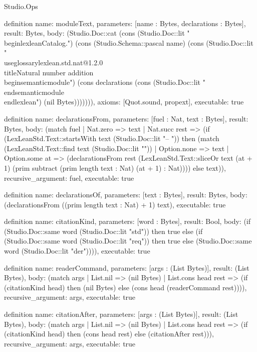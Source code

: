 \begin{lexlean}{Studio.Ops}
\begin{semanticmodule}
definition{
  name: moduleText,
  parameters: [name : Bytes, declarations : Bytes],
  result: Bytes,
  body: (Studio.Doc::cat (cons (Studio.Doc::lit "\\begin{lexlean}{Catalog.") (cons (Studio.Schema::pascal name) (cons (Studio.Doc::lit "}\n\\useglossary{lexlean.std.nat@1.2.0}\n\\title{Natural number addition}\n\\begin{semanticmodule}\n") (cons declarations (cons (Studio.Doc::lit "\\end{semanticmodule}\n\\end{lexlean}\n") (nil Bytes))))))),
  axioms: [Quot.sound, propext],
  executable: true
}

definition{
  name: declarationsFrom,
  parameters: [fuel : Nat, text : Bytes],
  result: Bytes,
  body: (match fuel
    | Nat.zero => text
    | Nat.succ rest => (if (LexLeanStd.Text::startsWith text (Studio.Doc::lit "-- ")) then (match (LexLeanStd.Text::find text (Studio.Doc::lit "\n"))
      | Option.none => text
      | Option.some at => (declarationsFrom rest (LexLeanStd.Text::sliceOr text (at + 1) (prim subtract (prim length text : Nat) (at + 1) : Nat)))) else text)),
  recursive_argument: fuel,
  executable: true
}

definition{
  name: declarationsOf,
  parameters: [text : Bytes],
  result: Bytes,
  body: (declarationsFrom ((prim length text : Nat) + 1) text),
  executable: true
}

definition{
  name: citationKind,
  parameters: [word : Bytes],
  result: Bool,
  body: (if (Studio.Doc::same word (Studio.Doc::lit "std")) then true else (if (Studio.Doc::same word (Studio.Doc::lit "req")) then true else (Studio.Doc::same word (Studio.Doc::lit "der")))),
  executable: true
}

definition{
  name: readerCommand,
  parameters: [args : (List Bytes)],
  result: (List Bytes),
  body: (match args
    | List.nil => (nil Bytes)
    | List.cons head rest => (if (citationKind head) then (nil Bytes) else (cons head (readerCommand rest)))),
  recursive_argument: args,
  executable: true
}

definition{
  name: citationAfter,
  parameters: [args : (List Bytes)],
  result: (List Bytes),
  body: (match args
    | List.nil => (nil Bytes)
    | List.cons head rest => (if (citationKind head) then (cons head rest) else (citationAfter rest))),
  recursive_argument: args,
  executable: true
}


\end{semanticmodule}
\end{lexlean}
